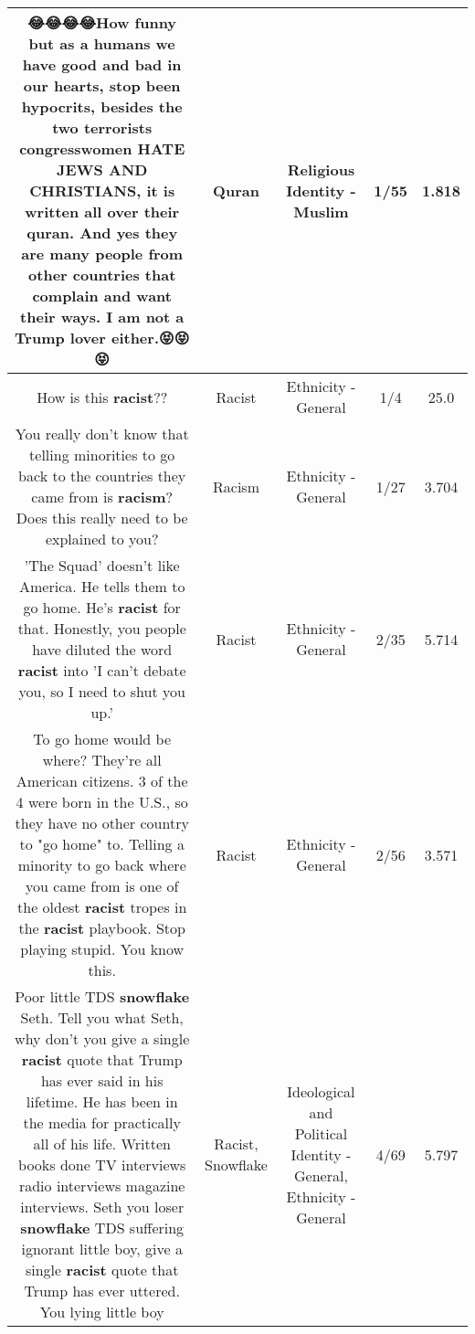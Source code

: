 \documentclass[11pt]{article}
\newlength\mylength
\begin{document}
\begin{center}
\begin{longtable}{|C{.65\mylength}|C{.30\mylength}|C{.12\mylength}|C{.12\mylength}|C{.12\mylength}|}
  \small 😂😂😂😂How funny but as a humans we have good and bad in our hearts, stop been hypocrits, besides the two terrorists congresswomen HATE JEWS AND CHRISTIANS, it is written all over their \textbf{quran}. And yes they are many people from other countries that complain and want their ways. I am not a Trump lover either.😝😝😝\normalsize   & Quran & Religious Identity - Muslim & 1/55 & 1.818 \\  \hline
  \small How is this \textbf{racist}??\normalsize   & Racist & Ethnicity - General & 1/4 & 25.0 \\  \hline
  \small You really don't know that telling minorities to go back to the countries they came from is \textbf{racism}? Does this really need to be explained to you?\normalsize   & Racism & Ethnicity - General & 1/27 & 3.704 \\  \hline
  \small 'The Squad' doesn't like America. He tells them to go home. He's \textbf{racist} for that. Honestly, you people have diluted the word \textbf{racist} into 'I can't debate you, so I need to shut you up.'\normalsize   & Racist & Ethnicity - General & 2/35 & 5.714 \\  \hline
  \small To go home would be where? They're all American citizens. 3 of the 4 were born in the U.S., so they have no other country to "go home" to. Telling a minority to go back where you came from is one of the oldest \textbf{racist} tropes in the \textbf{racist} playbook. Stop playing stupid. You know this.\normalsize   & Racist & Ethnicity - General & 2/56 & 3.571 \\  \hline
  \small Poor little TDS \textbf{snowflake} Seth. Tell you what Seth, why don't you give a single \textbf{racist} quote that Trump has ever said in his lifetime. He has been in the media for practically all of his life. Written books done TV interviews radio interviews magazine interviews.  Seth you loser \textbf{snowflake} TDS suffering ignorant little boy, give a single \textbf{racist} quote that Trump has ever uttered. You lying little boy\normalsize   & Racist, Snowflake &  Ideological and Political Identity - General, Ethnicity - General & 4/69 & 5.797 \\  \hline

\end{longtable}
\end{center}
\end{document}
